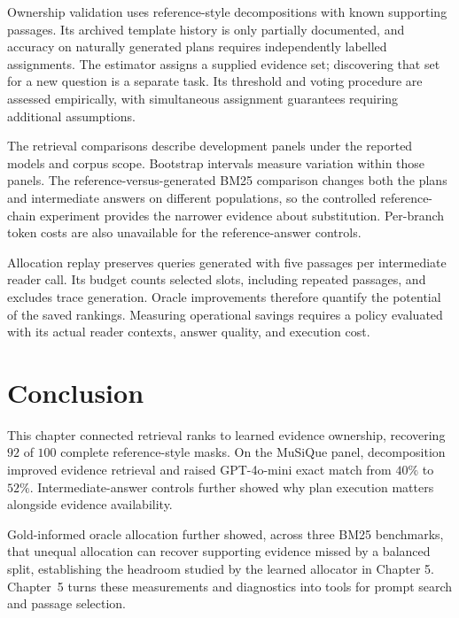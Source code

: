 Ownership validation uses reference-style decompositions with known supporting
passages. Its archived template history is only partially documented, and
accuracy on naturally generated plans requires independently labelled
assignments. The estimator assigns a supplied evidence set; discovering that
set for a new question is a separate task. Its threshold and voting procedure
are assessed empirically, with simultaneous assignment guarantees requiring
additional assumptions.

The retrieval comparisons describe development panels under the reported
models and corpus scope. Bootstrap intervals measure variation within those
panels. The reference-versus-generated BM25 comparison changes both the plans
and intermediate answers on different populations, so the controlled
reference-chain experiment provides the narrower evidence about substitution.
Per-branch token costs are also unavailable for the reference-answer controls.

Allocation replay preserves queries generated with five passages per
intermediate reader call. Its budget counts selected slots, including repeated
passages, and excludes trace generation. Oracle improvements therefore
quantify the potential of the saved rankings. Measuring operational savings
requires a policy evaluated with its actual reader contexts, answer quality,
and execution cost.

\section*{Conclusion}

This chapter connected retrieval ranks to learned evidence ownership,
recovering $92$ of $100$ complete reference-style masks. On the MuSiQue
panel, decomposition improved evidence retrieval and raised GPT-4o-mini
exact match from $40\%$ to $52\%$. Intermediate-answer controls further
showed why plan execution matters alongside evidence availability.

Gold-informed oracle allocation further showed, across three BM25 benchmarks, 
that unequal allocation can recover supporting evidence missed by a balanced split, 
establishing the headroom studied by the learned allocator in Chapter 5. 
Chapter~5 turns these measurements and diagnostics into
tools for prompt search and passage selection.
